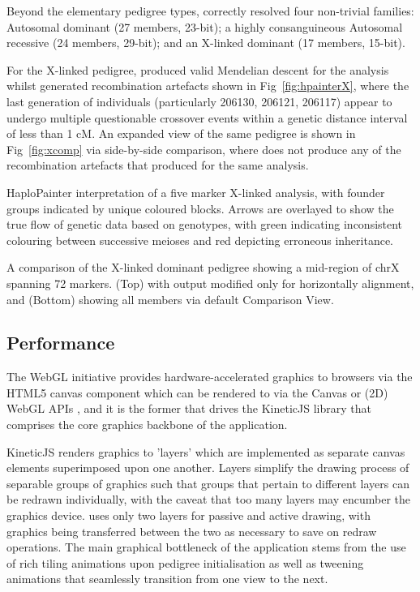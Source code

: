 Beyond the elementary pedigree types, \app correctly resolved four non-trivial families: Autosomal dominant (27 members, 23-bit); a highly consanguineous Autosomal recessive (24 members, 29-bit); and an X-linked dominant (17 members, 15-bit).

For the X-linked pedigree, \app produced valid Mendelian descent for the analysis whilst \app generated recombination artefacts shown in Fig~\ref{fig:hpainterX}, where the last generation of individuals (particularly 206130, 206121, 206117) appear to undergo multiple questionable crossover events within a genetic distance interval of less than 1 cM. An expanded view of the same pedigree is shown in Fig~\ref{fig:xcomp} via side-by-side comparison, where \app does not produce any of the recombination artefacts that \app produced for the same analysis.

	{HaploPainter interpretation of a five marker X-linked analysis, with founder groups indicated by unique coloured blocks. Arrows are overlayed to show the true flow of genetic data based on genotypes, with green indicating inconsistent colouring between successive meioses and red depicting erroneous inheritance.
}


	{A comparison of the X-linked dominant pedigree showing a mid-region of chrX spanning 72 markers.
(Top) \app with output modified only for horizontally alignment, and (Bottom) \app showing all members via default Comparison View.}


\subsection{Performance}

The WebGL initiative provides hardware-accelerated graphics to browsers via the HTML5 canvas component which can be rendered to via the Canvas or (2D) WebGL APIs \citep{whatwgliving}, and it is the former that drives the KineticJS library that comprises the core graphics backbone of the application.

KineticJS renders graphics to 'layers' which are implemented as separate canvas elements superimposed upon one another. Layers simplify the drawing process of separable groups of graphics such that groups that pertain to different layers can be redrawn individually, with the caveat that too many layers may encumber the graphics device. \app uses only two layers for passive and active drawing, with graphics being transferred between the two as necessary to save on redraw operations. The main graphical bottleneck of the application stems from the use of rich tiling animations upon pedigree initialisation as well as tweening animations that seamlessly transition from one view to the next.

